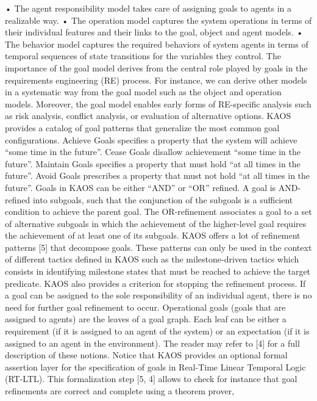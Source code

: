 • The agent responsibility model takes care of assigning goals to agents in a realizable
way.
• The operation model captures the system operations in terms of their individual
features and their links to the goal, object and agent models.
• The behavior model captures the required behaviors of system agents in terms of
temporal sequences of state transitions for the variables they control.
The importance of the goal model derives from the central role played by goals in the
requirements engineering (RE) process. For instance, we can derive other models in a systematic way from the goal model such as the object and operation models. Moreover, the
goal model enables early forms of RE-specific analysis such as risk analysis, conflict analysis,
or evaluation of alternative options.
KAOS provides a catalog of goal patterns that generalize the most common goal configurations. Achieve Goals specifies a property that the system will achieve “some time in
the future”. Cease Goals disallow achievement “some time in the future”. Maintain Goals
specifies a property that must hold “at all times in the future”. Avoid Goals prescribes a
property that must not hold “at all times in the future”.
Goals in KAOS can be either “AND” or “OR” refined. A goal is AND-refined into
subgoals, such that the conjunction of the subgoals is a sufficient condition to achieve the
parent goal. The OR-refinement associates a goal to a set of alternative subgoals in which the
achievement of the higher-level goal requires the achievement of at least one of its subgoals.
KAOS offers a lot of refinement patterns [5] that decompose goals. These patterns can only
be used in the context of different tactics defined in KAOS such as the milestone-driven
tactics which consists in identifying milestone states that must be reached to achieve the
target predicate.
KAOS also provides a criterion for stopping the refinement process. If a goal can be
assigned to the sole responsibility of an individual agent, there is no need for further goal
refinement to occur. Operational goals (goals that are assigned to agents) are the leaves of a
goal graph. Each leaf can be either a requirement (if it is assigned to an agent of the system)
or an expectation (if it is assigned to an agent in the environment). The reader may refer
to [4] for a full description of these notions.
Notice that KAOS provides an optional formal assertion layer for the specification of
goals in Real-Time Linear Temporal Logic (RT-LTL). This formalization step [5, 4] allows
to check for instance that goal refinements are correct and complete using a theorem prover,
